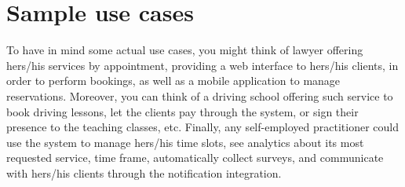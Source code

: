 \documentclass{article}
\begin{document}
\section{Sample use cases}
To have in mind some actual use cases, you might think of lawyer offering
hers/his services by appointment, providing a web interface to hers/his
clients, in order to perform bookings, as well as a mobile application to
manage reservations. Moreover, you can think of a driving school offering such
service to book driving lessons, let the clients pay through the system, or
sign their presence to the teaching classes, etc. Finally, any self-employed
practitioner could use the system to manage hers/his time slots, see analytics
about its most requested service, time frame, automatically collect surveys,
and communicate with hers/his clients through the notification integration.
\end{document}
